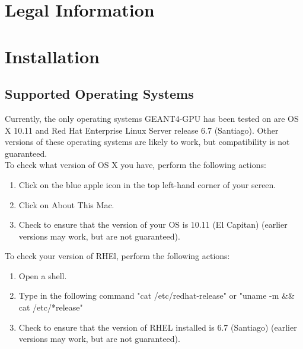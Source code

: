 \documentclass[12pt]{article}
\begin{document}
\section{Legal Information}	%

\section{Installation} %

\subsection{Supported Operating Systems} %
Currently, the only operating systems GEANT4-GPU has been tested on are OS X 10.11 and  Red Hat Enterprise Linux Server release 6.7 (Santiago). Other versions of these operating systems are likely to work, but compatibility is not guaranteed.\\
To check what version of OS X you have, perform the following actions:
\begin{enumerate}
\item Click on the blue apple icon in the top left-hand corner of your screen.
\item Click on About This Mac.
\item Check to ensure that the version of your OS is 10.11 (El Capitan) (earlier versions may work, but are not guaranteed).
\end{enumerate}
To check your version of RHEl, perform the following actions:
\begin{enumerate}
\item Open a shell.
\item Type in the following command "cat /etc/redhat-release" or "uname -m \&\& cat /etc/*release"
\item Check to ensure that the version of RHEL installed is 6.7 (Santiago) (earlier versions may work, but are not guaranteed).
\end{enumerate}
\end{document}
